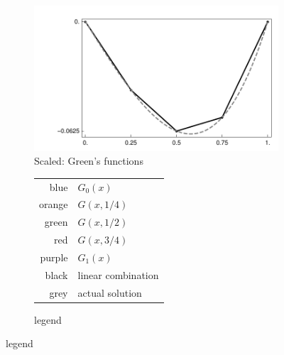 \documentclass[10pt]{article}
\begin{document}
\begin{solution}[Solution]
\begin{enumerate}
\begin{figure}[H]
\begin{subfigure}{.49\textwidth}
                \includegraphics[width=\textwidth]{img/g3.pdf}
                \caption{Scaled: Green's functions}
                \label{g3}
            \end{subfigure}
            \begin{subfigure}{.49\textwidth}\centering
                \begin{tabular}{rl}
                    blue & \( G_0(x) \)  \\
                    orange & \( G(x,1/4) \) \\
                    green & \( G(x,1/2) \) \\
                    red & \( G(x,3/4) \) \\
                    purple & \( G_1(x) \) \\
                    black & linear combination \\
                    grey & actual solution
                \end{tabular}
                \caption{legend}
            \end{subfigure}
        \end{figure}



\end{enumerate}



\end{solution}
\end{document}
